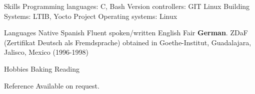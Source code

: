 \documentclass{resume}
\begin{document}
\begin{category}{Skills}
\citembullet Programming languages: C, Bash
\citembullet Version controllers: GIT
\citembullet Linux Building Systems: LTIB, Yocto Project
\citembullet Operating systems: Linux
\end{category}

\begin{category}{Languages}
\citembullet Native Spanish
\citembullet Fluent spoken/written English
\citembullet Fair \textbf{German}. ZDaF (Zertifikat Deutsch als Fremdsprache) obtained in Goethe-Institut, Guadalajara, Jalisco, Mexico (1996-1998)
\end{category}

\begin{category}{Hobbies}
\citembullet Baking
\citembullet Reading
\end{category}

\begin{category}{Reference} 
\citemnobullet Available on request.
\end{category}
\end{document}
